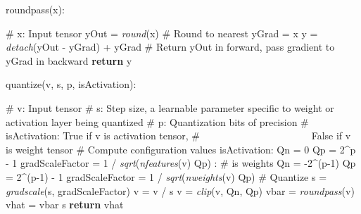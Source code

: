 \documentclass{article}
\begin{document}
\begin{algorithm}
   \caption{roundpass(x):}
   \label{alg:roundpass}
\begin{algorithmic}
   \STATE \# x: Input tensor   
   \STATE yOut = \textit{round}(x) \# Round to nearest
   \STATE yGrad = x
   \STATE y = \textit{detach}(yOut - yGrad) + yGrad \# Return yOut in forward, pass gradient to yGrad in backward
   \STATE \textbf{return} y
\end{algorithmic}
\end{algorithm}


\begin{algorithm}
   \caption{quantize(v, s, p, isActivation):}
   \label{alg:quantize}
\begin{algorithmic}
   \STATE \# v: Input tensor
   \STATE \# s: Step size, a learnable parameter specific to weight or activation layer being quantized
   \STATE \# p: Quantization bits of precision
   \STATE \# isActivation: True if v is activation tensor, 
   \STATE \# \ \ \ \ \ \ \ \ \ \ \ \ \ \ \ \ \ \ \ \ \ \  False if v is weight tensor
   \STATE 
   \STATE \# Compute configuration values   
    isActivation:
   \STATE\hspace{\algorithmicindent} Qn = 0
   \STATE\hspace{\algorithmicindent} Qp = 2\^{}p - 1 \STATE\hspace{\algorithmicindent} gradScaleFactor = 1 / \textit{sqrt}(\textit{nfeatures}(v)  Qp)   
   : \# is weights
   \STATE\hspace{\algorithmicindent} Qn = -2\^{}(p-1)\STATE\hspace{\algorithmicindent} Qp = 2\^{}(p-1) - 1 \STATE\hspace{\algorithmicindent} gradScaleFactor = 1 / \textit{sqrt}(\textit{nweights}(v)  Qp)   
   \STATE
   \STATE \# Quantize
   \STATE s = \textit{gradscale}(s, gradScaleFactor)
   \STATE v = v / s
   \STATE v = \textit{clip}(v, Qn, Qp)
   \STATE vbar = \textit{roundpass}(v)
   \STATE vhat = vbar  s
   \STATE\textbf{return} vhat
\end{algorithmic}
\end{algorithm}
\end{document}
